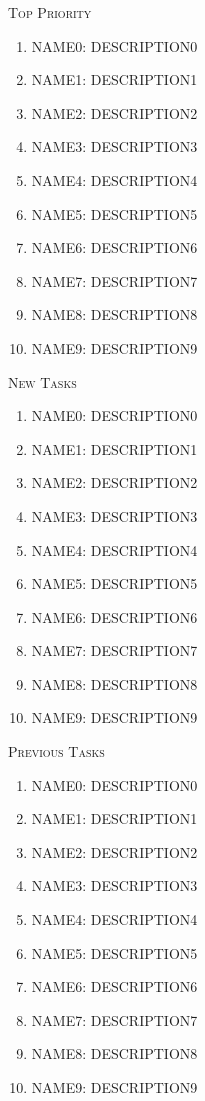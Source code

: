 
\large
                \textsc{{Top Priority}}
                \normalsize\begin{enumerate}\item {} NAME0: DESCRIPTION0\item {} NAME1: DESCRIPTION1\item {} NAME2: DESCRIPTION2\item {} NAME3: DESCRIPTION3\item {} NAME4: DESCRIPTION4\item {} NAME5: DESCRIPTION5\item {} NAME6: DESCRIPTION6\item {} NAME7: DESCRIPTION7\item {} NAME8: DESCRIPTION8\item {} NAME9: DESCRIPTION9\end{enumerate}\vspace{.5cm}\large
                \textsc{{New Tasks}}
                \normalsize\begin{enumerate}\item {} NAME0: DESCRIPTION0\item {} NAME1: DESCRIPTION1\item {} NAME2: DESCRIPTION2\item {} NAME3: DESCRIPTION3\item {} NAME4: DESCRIPTION4\item {} NAME5: DESCRIPTION5\item {} NAME6: DESCRIPTION6\item {} NAME7: DESCRIPTION7\item {} NAME8: DESCRIPTION8\item {} NAME9: DESCRIPTION9\end{enumerate}\clearpage\large
                \textsc{{Previous Tasks}}
                \normalsize\begin{enumerate}\item {} NAME0: DESCRIPTION0\item {} NAME1: DESCRIPTION1\item {} NAME2: DESCRIPTION2\item {} NAME3: DESCRIPTION3\item {} NAME4: DESCRIPTION4\item {} NAME5: DESCRIPTION5\item {} NAME6: DESCRIPTION6\item {} NAME7: DESCRIPTION7\item {} NAME8: DESCRIPTION8\item {} NAME9: DESCRIPTION9\end{enumerate}\vspace{.5cm}